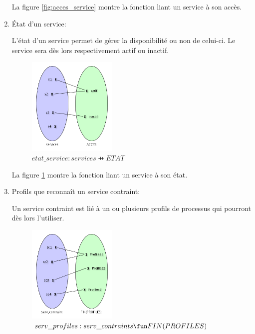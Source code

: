 \documentclass[french, titlepage, 10pt, a4paper]{article}
\begin{document}
\begin{enumerate}
    La figure \ref{fig:acces_service} montre la fonction liant un service à son
    accès.

  \item État d'un service:

    L'état d'un service permet de gérer la disponibilité ou non de celui-ci.
    Le service sera dès lors respectivement actif ou inactif.

    \begin{figure}[htb]
      \centering
      \includegraphics[width=0.4\textwidth]{etat_service.png}
      \caption{$etat\_service: services \pfun ETAT$}
      \label{fig:etat_service}
    \end{figure}

    La figure \ref{fig:etat_service} montre la fonction liant un service à son
    état.

  \item Profils que reconnaît un service contraint:

    Un service contraint est lié à un ou plusieurs profils de processus qui
    pourront dès lors l'utiliser.

    \begin{figure}[htb]
      \centering
      \includegraphics[width=0.4\textwidth]{serv_profiles.png}
      \caption{$serv\_profiles: serv\_contraints \fun FIN(PROFILES)$}
      \label{fig:serv_profiles}
    \end{figure}


\end{enumerate}
\end{document}
